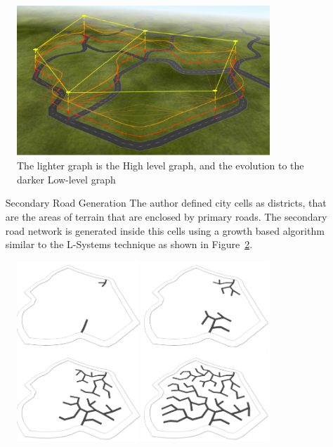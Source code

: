 \begin{figure}[htbp]
	\centering
	\includegraphics[width=0.85\textwidth]{img/CityGen/RoadGraphs.png}
	\caption{The lighter graph is the High level graph, and the evolution to the darker Low-level graph }
	\label{fig:graphs}
\end{figure}

\begin{itemize}
	\item[Secondary Road Generation] The author defined city cells as districts, that are the areas of terrain that are enclosed by primary roads. The secondary road network is generated inside this cells using a growth based algorithm similar to the L-Systems technique as shown in Figure~\ref{fig:graphs2}.
\end{itemize}
\emph{}



\begin{figure}[htbp]
	\centering
	\includegraphics[width=0.85\textwidth]{img/CityGen/SecondaryRoadGrowth.png}
	\caption{}
	\label{fig:graphs2}
\end{figure}




